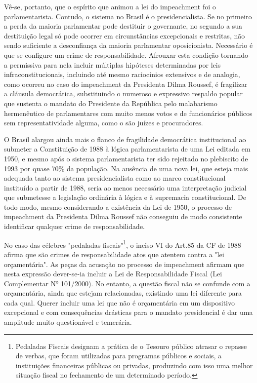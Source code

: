 Vê-se, portanto, que o espírito que animou a lei do impeachment foi o
parlamentarista. Contudo, o sistema no Brasil é o presidencialista. Se
no primeiro a perda da maioria parlamentar pode destituir o governante,
no segundo a sua destituição legal só pode ocorrer em circunstâncias
excepcionais e restritas, não sendo suficiente a desconfiança da maioria
parlamentar oposicionista. Necessário é que se configure um crime de
responsabilidade. Afrouxar esta condição tornando-a permissiva para nela
incluir múltiplas hipóteses determinadas por leis infraconstitucionais,
incluindo até mesmo raciocínios extensivos e de analogia, como ocorreu
no caso do impeachment da Presidenta Dilma Roussef, é fragilizar a
cláusula democrática, substituindo o numeroso e expressivo respaldo
popular que sustenta o mandato do Presidente da República pelo
malabarismo hermenêutico de parlamentares com muito menos votos e de
funcionários públicos sem representatividade alguma, como o são juízes e
procuradores.

O Brasil alargou ainda mais o flanco de fragilidade democrática
institucional ao submeter a Constituição de 1988 à lógica
parlamentarista de uma Lei editada em 1950, e mesmo após o sistema
parlamentarista ter sido rejeitado no plebiscito de 1993 por quase 70\%
da população. Na ausência de uma nova lei, que esteja mais adequada
tanto ao sistema presidencialista como ao marco constitucional
instituído a partir de 1988, seria ao menos necessário uma interpretação
judicial que submetesse a legislação ordinária à lógica e à supremacia
constitucional. De todo modo, mesmo considerando a existência da Lei de
1950, o processo de impeachment da Presidenta Dilma Roussef não
conseguiu de modo consistente identificar qualquer crime de
responsabilidade.

No caso das célebres "pedaladas fiscais"\footnote{Pedaladas Fiscais
  designam a prática de o Tesouro público atrasar o repasse de verbas,
  que foram utilizadas para programas públicos e sociais, a instituições
  financeiras públicas ou privadas, produzindo com isso uma melhor
  situação fiscal no fechamento de um determinado período.}, o inciso VI
do Art.85 da CF de 1988 afirma que são crimes de responsabilidade atos
que atentem contra a "lei orçamentária". As peças da acusação no
processo de impeachment afirmam que nesta expressão dever-se-ia incluir
a Lei de Responsabilidade Fiscal (Lei Complementar N° 101/2000). No
entanto, a questão fiscal não se confunde com a orçamentária, ainda que
estejam relacionadas, existindo uma lei diferente para cada qual. Querer
incluir uma lei que não é orçamentária em um dispositivo excepcional e
com consequências drásticas para o mandato presidencial é dar uma
amplitude muito questionável e temerária.

